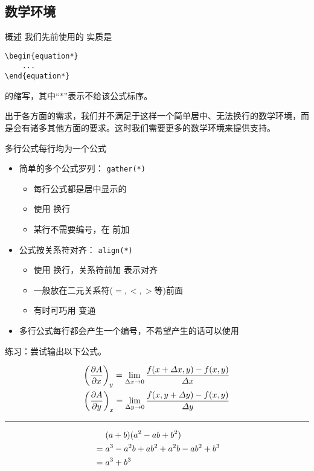 \subsection{数学环境}
\begin{frame}[fragile]{概述}
	我们先前使用的 \cprotect\fbox{\verb|\[|$\dots$\verb|\]|} 实质是
\begin{lstlisting}
\begin{equation*}
    ...
\end{equation*}
\end{lstlisting}
	的缩写，其中“$*$”表示不给该公式标序。

	\vspace{2ex}
	出于各方面的需求，我们并不满足于这样一个简单居中、无法换行的数学环境，而是会有诸多其他方面的要求。这时我们需要更多的数学环境来提供支持。
\end{frame}
\begin{frame}[fragile]{多行公式}{每行均为一个公式}
	\begin{itemize}
		\item 简单的多个公式罗列： \verb|gather(*)|
		\begin{itemize}
			\item 每行公式都是居中显示的
			\item 使用 \cprotect\fbox{\verb|\\|} 换行
			\item 某行不需要编号，在 \cprotect\fbox{\verb|\\|} 前加  \cprotect\fbox{\verb|\notag|} 
		\end{itemize}
		\item 公式按关系符对齐： \verb|align(*)|
		\begin{itemize}
			\item 使用 \cprotect\fbox{\verb|\\|} 换行，关系符前加 \cprotect\fbox{\verb|&|} 表示对齐
			\item \cprotect\fbox{\verb|&|} 一般放在二元关系符($=,<,>$等)前面
			\item 有时可巧用 \cprotect\fbox{\verb|\phantom|} 变通 
		\end{itemize}
		\item 多行公式每行都会产生一个编号，不希望产生的话可以使用\cprotect\fbox{\verb|\notag|}
	\end{itemize}
\end{frame}
\begin{frame}
	练习：尝试输出以下公式。

	\begin{minipage}{0.95\textwidth}
	\begin{gather}
		\left(\dfrac{\partial A}{\partial x}\right)_{y} = \lim_{\Delta x \to 0} \frac{f(x+\varDelta x,y)-f(x,y)}{\varDelta x} \\
		\left(\dfrac{\partial A}{\partial y}\right)_{x} = \lim_{\Delta y \to 0} \frac{f(x,y+\varDelta y)-f(x,y)}{\varDelta y}
	\end{gather}
	\hrule
	\begin{align}
		& \mathrel{\phantom{=}} (a + b)(a^2 - ab + b^2)\notag \\
		& = a^3 - a^2b + ab^2 + a^2b - ab^2 + b^3\notag \\
		& = a^3 + b^3
	\end{align}
	\end{minipage}
\end{frame}
